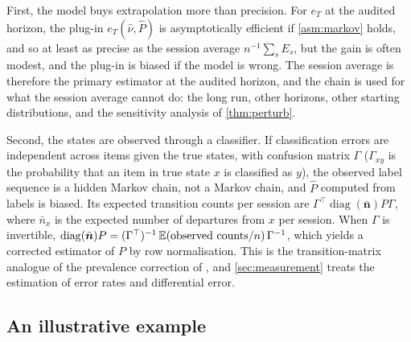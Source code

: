 First, the model buys extrapolation more than precision. For $e_T$ at the audited horizon, the plug-in $e_T(\hat\nu,\hat P)$ is asymptotically efficient if \cref{asm:markov} holds, and so at least as precise as the session average $n^{-1}\sum_sE_s$, but the gain is often modest, and the plug-in is biased if the model is wrong. The session average is therefore the primary estimator at the audited horizon, and the chain is used for what the session average cannot do: the long run, other horizons, other starting distributions, and the sensitivity analysis of \cref{thm:perturb}.

Second, the states are observed through a classifier. If classification errors are independent across items given the true states, with confusion matrix $\Gamma$ ($\Gamma_{xy}$ is the probability that an item in true state $x$ is classified as $y$), the observed label sequence is a hidden Markov chain, not a Markov chain, and $\hat P$ computed from labels is biased. Its expected transition counts per session are $\Gamma^{\top}\operatorname{diag}(\bar{\bm n})P\Gamma$, where $\bar n_x$ is the expected number of departures from $x$ per session. When $\Gamma$ is invertible, $\operatorname{diag}(\bar{\bm n})P=(\Gamma^{\top})^{-1}\,\mathbb{E}(\text{observed counts}/n)\,\Gamma^{-1}$, which yields a corrected estimator of $P$ by row normalisation. This is the transition-matrix analogue of the prevalence correction of \citet{rogangladen1978}, and \cref{sec:measurement} treats the estimation of error rates and differential error.

\subsection{An illustrative example}\label{sec:markov-example}

